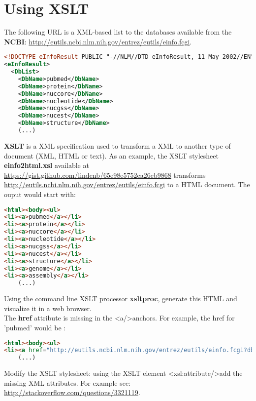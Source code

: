 \documentclass{article}
\begin{document}
\section{Using XSLT}
The following URL is a XML-based list to the databases available from the  \textbf{NCBI}: \url{http://eutils.ncbi.nlm.nih.gov/entrez/eutils/einfo.fcgi}.\\
\begin{lstlisting}[language=xml]
<!DOCTYPE eInfoResult PUBLIC "-//NLM//DTD eInfoResult, 11 May 2002//EN" "http://www.ncbi.nlm.nih.gov/entrez/query/DTD/eInfo_020511.dtd">
<eInfoResult>
  <DbList>
    <DbName>pubmed</DbName>
    <DbName>protein</DbName>
    <DbName>nuccore</DbName>
    <DbName>nucleotide</DbName>
    <DbName>nucgss</DbName>
    <DbName>nucest</DbName>
    <DbName>structure</DbName>
    (...)
\end{lstlisting}  
\textbf{XSLT} is a XML specification used to transform a XML to another type of document (XML, HTML or text).
As an example, the XSLT stylesheet \textbf{einfo2html.xsl} available at \url{https://gist.github.com/lindenb/65e98e5752ea26eb9868} transforms  \url{http://eutils.ncbi.nlm.nih.gov/entrez/eutils/einfo.fcgi} to a HTML document. The ouput would start with:\\
\begin{lstlisting}[language=html]
<html><body><ul>
<li><a>pubmed</a></li>
<li><a>protein</a></li>
<li><a>nuccore</a></li>
<li><a>nucleotide</a></li>
<li><a>nucgss</a></li>
<li><a>nucest</a></li>
<li><a>structure</a></li>
<li><a>genome</a></li>
<li><a>assembly</a></li>
    (...)
\end{lstlisting} 
\noindent
Using the command line XSLT processor \textbf{xsltproc}, generate this HTML and visualize it in a web browser.\\
The \textbf{href} attribute is missing in the \textless{}a/\textgreater anchors. For example, the href for 'pubmed' would be :

\begin{lstlisting}[language=html]
<html><body><ul>
<li><a href="http://eutils.ncbi.nlm.nih.gov/entrez/eutils/einfo.fcgi?db=pubmed">pubmed</a></li>
    (...)
\end{lstlisting} 
\noindent
Modify the XSLT stylesheet: using the XSLT element \textless{}xsl:attribute/\textgreater add the missing XML attributes. For example see: \url{http://stackoverflow.com/questions/3321119}.
\end{document}
